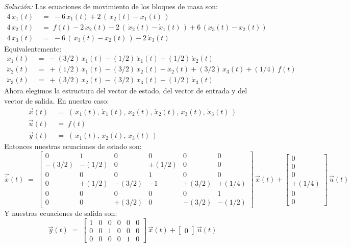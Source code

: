\documentclass[ a4paper, twoside, 11pt]{article}
\begin{document}
\begin{problem}
\emph{Soluci\'on:} Las ecuaciones de movimiento de los bloques de masa son: 
\begin{align*}
4 \, \ddot{x}_1(t) \;
& = \; -6 \, x_1(t) + 2 \, ( \, \dot{x}_2(t) - \dot{x}_1(t) \, ) \\
4 \, \ddot{x}_2(t) \;
& = \; f(t) -2 \, \dot{x}_2(t) - 2 \, ( \, \dot{x}_2(t) - \dot{x}_1(t) \, ) + 6 \, ( x_3(t) - x_2(t) ) \\
4 \, \ddot{x}_3(t) \;
& = \; -6 \, ( \, x_3(t) - x_2(t) \, ) - 2 \, \dot{x}_3(t)
\end{align*}
Equivalentemente: 
\begin{align*}
\ddot{x}_1(t) \;
& = \; -(3/2) \, x_1(t) - (1/2) \, \dot{x}_1(t) + (1/2) \, \dot{x}_2(t) \\
\ddot{x}_2(t) \;
& = \; +(1/2) \, \dot{x}_1(t) - (3/2) \, x_2(t) - \dot{x}_2(t) + (3/2) \, x_3(t) + (1/4) \, f(t) \\
\ddot{x}_3(t) \;
& = \; +(3/2) \, x_2(t) - (3/2) \, x_3(t) - (1/2) \, \dot{x}_3(t)
\end{align*}
Ahora elegimos la estructura del vector de estado, del vector de entrada y del vector de salida. En nuestro caso: 
\begin{align*}
\vec{x}(t) \;
& = \; (\,
x_1(t), \, \dot{x}_1(t), \,
x_2(t), \, \dot{x}_2(t), \,
x_3(t), \, \dot{x}_3(t) \, ) \\
\vec{u}(t) \;
& = \; f(t) \\
\vec{y}(t) \;
& = \; (\, x_1(t), \, x_2(t), \, x_3(t) \, )
\end{align*}
Entonces nuestras ecuaciones de estado son: 
\[
\vec{\dot{x}}(t) \; = \; 
\left[ \begin{array}{cccccc}
0 & 1 & 0 & 0 & 0 & 0 \\
-(3/2) & -(1/2) & 0 & +(1/2) & 0 & 0 \\
0 & 0 & 0 & 1 & 0 & 0 \\
0 & +(1/2) & -(3/2) & -1 & +(3/2) & +(1/4) \\
0 & 0 & 0 & 0 & 0 & 1 \\
0 & 0 & +(3/2) & 0 & -(3/2) & -(1/2)
\end{array} \right] \, \vec{x}(t) +
\left[ \begin{array}{c}
0 \\ 0 \\ 0 \\ +(1/4) \\ 0 \\ 0
\end{array} \right] \, \vec{u}(t)
\]
Y nuestras ecuaciones de salida son: 
\[
\vec{y}(t) \; = \;
\left[ \begin{array}{cccccc}
1 & 0 & 0 & 0 & 0 & 0 \\
0 & 0 & 1 & 0 & 0 & 0 \\
0 & 0 & 0 & 0 & 1 & 0
\end{array} \right] \, \vec{x}(t) +
\left[ \begin{array}{c}
0
\end{array} \right] \, \vec{u}(t)
\]

\end{problem}
\vspace{\baselineskip}
\end{document}
